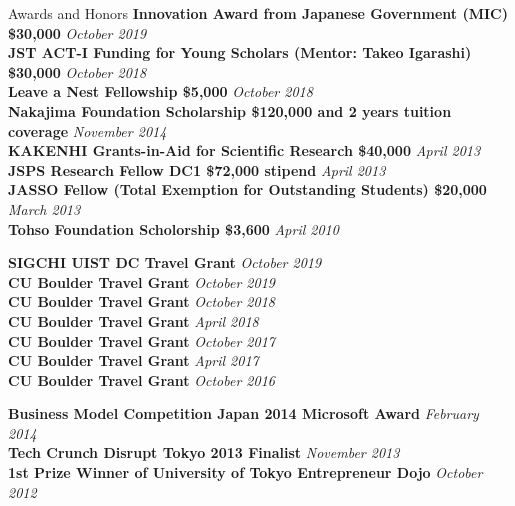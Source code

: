 \documentclass{resume} %
\begin{document}
\begin{rSection}{Awards and Honors}
{\bf Innovation Award from Japanese Government (MIC) \$30,000} \hfill {\em October 2019} \\
{\bf JST ACT-I Funding for Young Scholars (Mentor: Takeo Igarashi) \$30,000} \hfill {\em October 2018} \\
{\bf Leave a Nest Fellowship \$5,000} \hfill {\em October 2018} \\
{\bf Nakajima Foundation Scholarship \$120,000 and 2 years tuition coverage} \hfill {\em November 2014} \\
{\bf KAKENHI Grants-in-Aid for Scientific Research \$40,000} \hfill {\em April 2013} \\
{\bf JSPS Research Fellow DC1 \$72,000 stipend} \hfill {\em April 2013} \\
{\bf JASSO Fellow (Total Exemption for Outstanding Students) \$20,000} \hfill {\em March 2013} \\
{\bf Tohso Foundation Scholorship \$3,600} \hfill {\em April 2010} 

{\bf SIGCHI UIST DC Travel Grant} \hfill {\em October 2019} \\
{\bf CU Boulder Travel Grant} \hfill {\em October 2019} \\
{\bf CU Boulder Travel Grant} \hfill {\em October 2018} \\
{\bf CU Boulder Travel Grant} \hfill {\em April 2018} \\
{\bf CU Boulder Travel Grant} \hfill {\em October 2017} \\
{\bf CU Boulder Travel Grant} \hfill {\em April 2017} \\
{\bf CU Boulder Travel Grant} \hfill {\em October 2016} 

{\bf Business Model Competition Japan 2014 Microsoft Award} \hfill {\em February 2014} \\
{\bf Tech Crunch Disrupt Tokyo 2013 Finalist} \hfill {\em November 2013} \\
{\bf 1st Prize Winner of University of Tokyo Entrepreneur Dojo} \hfill {\em October 2012} \\
\end{rSection}
\end{document}
